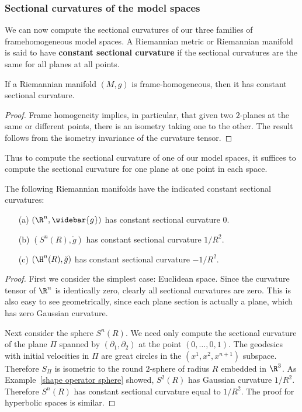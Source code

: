 \subsubsection{Sectional curvatures of the model spaces}
We can now compute the sectional curvatures of our three families of framehomogeneous model spaces. A Riemannian metric or Riemannian manifold is said to have 
\textbf{constant sectional curvature} if the sectional curvatures are the same for all planes at all points.
\begin{lemma}
If a Riemannian manifold $(M,g)$ is frame-homogeneous, then it has constant sectional curvature.
\end{lemma}
\begin{proof}
Frame homogeneity implies, in particular, that given two $2$-planes at the same or different points, there is an isometry taking one to the other. The result follows from 
the isometry invariance of the curvature tensor.
\end{proof}
Thus to compute the sectional curvature of one of our model spaces, it suffices to compute the sectional curvature for one plane at one point in each space.
\begin{theorem}
The following Riemannian manifolds have the indicated constant sectional curvatures:
\begin{itemize}
\item[(a)] $(\R^n,\widebar{g})$ has constant sectional curvature $0$.
\item[(b)] $(S^n(R),\mathring{g})$ has constant sectional curvature $1/R^2$.
\item[(c)] $(\H^n(R),\breve{g})$ has constant sectional curvature $-1/R^2$.
\end{itemize}
\end{theorem}
\begin{proof}
First we consider the simplest case: Euclidean space. Since the curvature tensor of $\R^n$ is identically zero, clearly all sectional curvatures are zero. This is also 
easy to see geometrically, since each plane section is actually a plane, which has zero Gaussian curvature.\par
Next consider the sphere $S^n(R)$. We need only compute the sectional curvature of the plane $\Pi$ spanned by $(\partial_1,\partial_2)$ at the point $(0,\dots,0,1)$. 
The geodesics with initial velocities in $\Pi$ are great circles in the $(x^1,x^2,x^{n+1})$ subspace. Therefore $S_{\Pi}$ is isometric to the round $2$-sphere of radius 
$R$ embedded in $\R^3$. As Example~\ref{shape operator sphere} showed, $S^2(R)$ has Gaussian curvature $1/R^2$. Therefore $S^n(R)$ has constant sectional curvature 
equal to $1/R^2$. The proof for hyperbolic spaces is similar.
\end{proof}
